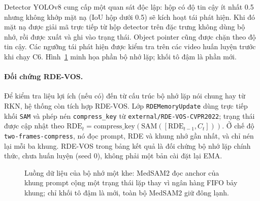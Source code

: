 \documentclass[a4paper,12pt]{report}
\begin{document}
Detector YOLOv8 cung cấp một quan sát độc lập: hộp có độ tin cậy ít nhất 0.5 nhưng không khớp mặt nạ (IoU hộp dưới 0.5) sẽ kích hoạt tái phát hiện. Khi đó mặt nạ được giải mã trực tiếp từ hộp detector trên đặc trưng không dùng bộ nhớ, rồi được xuất và ghi vào trạng thái. Object pointer cũng được chặn theo độ tin cậy. Các ngưỡng tái phát hiện được kiểm tra trên các video huấn luyện trước khi chạy C6. Hình~\ref{fig:arch} minh họa phần bộ nhớ lặp; khối tô đậm là phần mới.

\paragraph{Đối chứng RDE-VOS.} Để kiểm tra liệu lợi ích (nếu có) đến từ cấu trúc bộ nhớ lặp nói chung hay từ RKN, hệ thống còn tích hợp RDE-VOS. Lớp \texttt{RDEMemoryUpdate} dùng trực tiếp khối \texttt{SAM} và phép nén \texttt{compress\_key} từ \texttt{external/RDE-VOS-CVPR2022}; trạng thái được cập nhật theo $\mathrm{RDE}_t=\mathrm{compress\_key}(\mathrm{SAM}([\mathrm{RDE}_{t-1},C_t]))$. Ở chế độ \texttt{two-frames-compress}, nó đọc prompt, RDE và khung nhớ gần nhất, và chỉ nén lại mỗi ba khung. RDE-VOS trong bảng kết quả là đối chứng bộ nhớ lặp chính thức, chưa huấn luyện (seed 0), không phải một bản cài đặt lại EMA.

\begin{figure}[htbp]
\centering
{}

\caption{Luồng dữ liệu của bộ nhớ một khe: MedSAM2 đọc anchor của khung prompt cộng một trạng thái lặp thay vì ngân hàng FIFO bảy khung; chỉ khối tô đậm là mới, toàn bộ MedSAM2 giữ đông lạnh.}
\label{fig:arch}
\end{figure}
\end{document}

